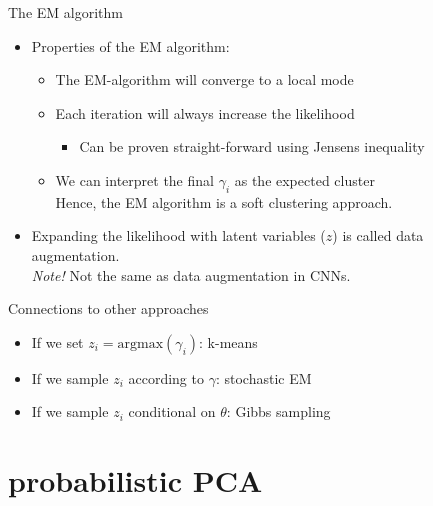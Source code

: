 \documentclass[10pt]{beamer}
\begin{document}
\begin{frame}{The EM algorithm}

\begin{itemize}
\item Properties of the EM algorithm:
\begin{itemize}
\item The EM-algorithm will converge to a {\color{uured} local mode}\pause
\item Each iteration will {\color{uured} always} increase the likelihood
\begin{itemize}
\item Can be proven straight-forward using Jensens inequality%
\end{itemize}
\pause
\item We can interpret the final $\gamma_i$ as the {\color{uured} expected cluster}\\
Hence, the EM algorithm is a {\color{uured} soft clustering} approach.
\end{itemize}
\item Expanding the likelihood with latent variables ($z$) is called {\color{uured} data augmentation}.
\\ \emph{Note!} Not the same as data augmentation in CNNs.
\end{itemize}

\end{frame}


\begin{frame}{Connections to other approaches}

\begin{itemize}
\item If we set $z_i = \text{argmax}(\gamma_i)$: {\color{uured} k-means}\pause
\item If we sample $z_i$ according to $\gamma$: {\color{uured} stochastic EM}
\item If we sample $z_i$ conditional on $\theta$: {\color{uured} Gibbs sampling}

\end{itemize}

\end{frame}

\section{probabilistic PCA}
\frame{\sectionpage}
\end{document}
